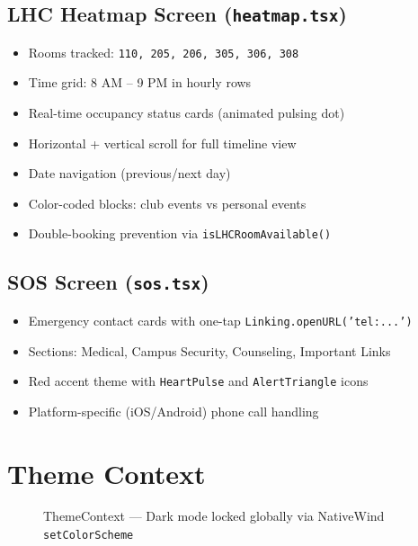 \documentclass[12pt,a4paper]{report}
\newcommand{\code}[1]{\texttt{\small\color{type}#1}}
\begin{document}
\subsection{LHC Heatmap Screen (\texttt{heatmap.tsx})}

\begin{itemize}[leftmargin=*]
  \item Rooms tracked: \texttt{110, 205, 206, 305, 306, 308}
  \item Time grid: 8 AM – 9 PM in hourly rows
  \item Real-time occupancy status cards (animated pulsing dot)
  \item Horizontal + vertical scroll for full timeline view
  \item Date navigation (previous/next day)
  \item Color-coded blocks: club events vs personal events
  \item Double-booking prevention via \code{isLHCRoomAvailable()}
\end{itemize}

\subsection{SOS Screen (\texttt{sos.tsx})}

\begin{itemize}[leftmargin=*]
  \item Emergency contact cards with one-tap \code{Linking.openURL('tel:...')}
  \item Sections: Medical, Campus Security, Counseling, Important Links
  \item Red accent theme with \code{HeartPulse} and \code{AlertTriangle} icons
  \item Platform-specific (iOS/Android) phone call handling
\end{itemize}

\section{Theme Context}

\begin{figure}[H]
\centering
{}
\caption{ThemeContext — Dark mode locked globally via NativeWind \texttt{setColorScheme}}
\end{figure}
\end{document}
